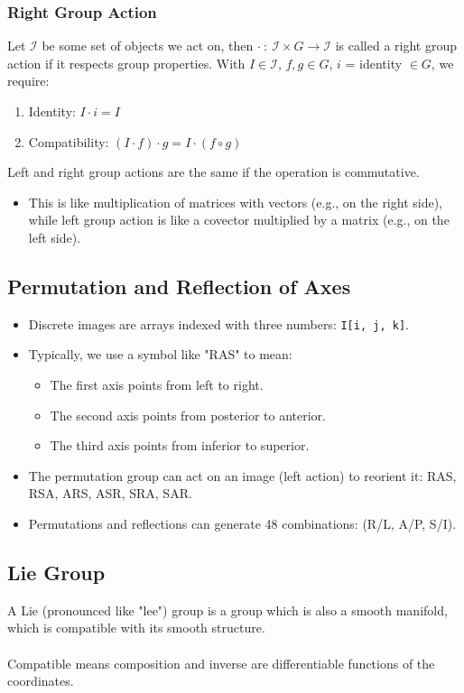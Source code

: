 \documentclass[10pt]{article}
\begin{document}
\subsubsection*{Right Group Action}
Let $\mathcal{I}$ be some set of objects we act on, then $\cdot \::\: \mathcal{I} \times G \rightarrow \mathcal{I}$ is called a right group action if it respects group properties.  With $I \in \mathcal{I}$, $f, g \in G$, $i$ = identity $\in G$, we require:
\begin{enumerate}
    \item Identity: $I \cdot i = I$
    \item Compatibility: $ (I \cdot f) \cdot g = I \cdot (f \circ g)$
\end{enumerate}
Left and right group actions are the same if the operation is commutative.
\begin{itemize}
    \item This is like multiplication of matrices with vectors (e.g., on the right side), while left group action is like a covector multiplied by a matrix (e.g., on the left side).
\end{itemize}

\subsection*{Permutation and Reflection of Axes}
\begin{itemize}
    \item Discrete images are arrays indexed with three numbers: \texttt{I[i, j, k]}.
    \item Typically, we use a symbol like "RAS" to mean:
    \begin{itemize}
        \item The first axis points from left to right.
        \item The second axis points from posterior to anterior.
        \item The third axis points from inferior to superior.
    \end{itemize}
    \item The permutation group can act on an image (left action) to reorient it: RAS, RSA, ARS, ASR, SRA, SAR.
    \item Permutations and reflections can generate 48 combinations: (R/L, A/P, S/I).
\end{itemize}

\subsection*{Lie Group}
A Lie (pronounced like "lee") group is a group which is also a smooth manifold, which is compatible with its smooth structure.\\\\
Compatible means composition and inverse are differentiable functions of the coordinates.
\end{document}
